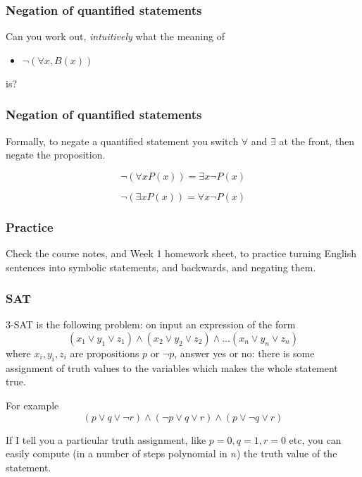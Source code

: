 \documentclass[10pt]{beamer}
\theoremstyle{definition}
\begin{document}
\begin{frame}
\frametitle{Negation of quantified statements}


Can you work out, {\em intuitively} what the meaning of 

\begin{itemize}\item 
 $\neg\left(\forall x, B(x)\right)$ 
\end{itemize}

is?
\vspace{2cm}
\vfill
\end{frame}


\begin{frame}
\frametitle{Negation of quantified statements}
Formally, to negate a quantified statement you switch $\forall$ and $\exists$ at the front, then negate the proposition.

$$\neg\left(\forall x P(x)\right) = \exists x \neg P(x)$$

\bigskip

$$\neg\left(\exists x P(x)\right) = \forall x \neg P(x)$$

\vspace{2cm}
\vfill
\end{frame}


\begin{frame}
\frametitle{Practice}

Check the course notes, and Week 1 homework sheet, to practice turning English sentences into symbolic statements, and backwards, and negating them.

\vspace{2cm}
\vfill
\end{frame}

\begin{frame}
\frametitle{SAT}


$3$-SAT is the following problem: on input an expression of the form 
$$(x_1\vee y_1\vee z_1)\wedge(x_2\vee y_2\vee z_2)\wedge \dots (x_n\vee y_n\vee z_n)$$
where $x_i,y_i,z_i$ are propositions $p$ or $\neg p$, answer  yes or no: there is some assignment of truth values to the variables which makes the whole statement true.


\bigskip
For example
$$(p\vee q\vee \neg r)\wedge(\neg p\vee q\vee r)\wedge (p\vee \neg q\vee  r)$$

\pause

If I tell you a particular truth assignment, like $p=0, q=1,r=0$ etc, you can easily compute (in a number of steps polynomial in $n$) the truth value of the statement.


\vspace{2cm}
\vfill
\end{frame}
\end{document}
